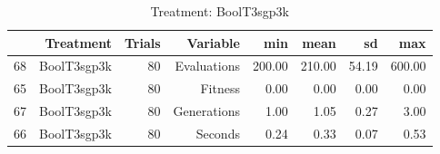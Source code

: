 \begin{table}[ht]
\centering
\begin{tabular}{rrrrrrrr}
  \hline
 & Treatment & Trials & Variable & min & mean & sd & max \\ 
  \hline
68 & BoolT3sgp3k &  80 & Evaluations & 200.00 & 210.00 & 54.19 & 600.00 \\ 
  65 & BoolT3sgp3k &  80 & Fitness & 0.00 & 0.00 & 0.00 & 0.00 \\ 
  67 & BoolT3sgp3k &  80 & Generations & 1.00 & 1.05 & 0.27 & 3.00 \\ 
  66 & BoolT3sgp3k &  80 & Seconds & 0.24 & 0.33 & 0.07 & 0.53 \\ 
   \hline
\end{tabular}
\caption{Treatment: BoolT3sgp3k} 
\end{table}
